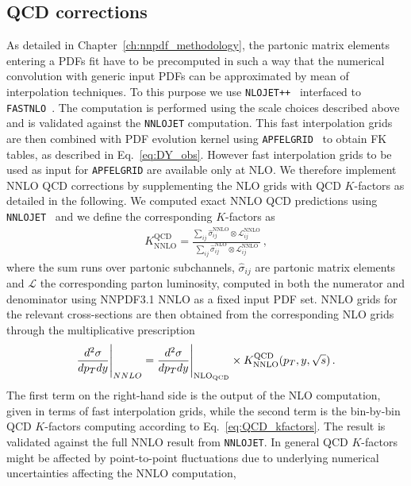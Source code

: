 \subsection{QCD corrections}
As detailed in Chapter~\ref{ch:nnpdf_methodology}, the partonic matrix elements entering a PDFs fit
have to be precomputed in such a way that the numerical convolution with generic input PDFs can be approximated by mean
of interpolation techniques. 
To this purpose we use {\tt NLOJET++}~\cite{Nagy:2001fj} interfaced to {\tt F{\small AST}NLO}~\cite{Wobisch:2011ij}.
The computation is performed using the scale choices described above and is validated against the {\tt NNLOJET} computation.
This fast interpolation grids are then combined with PDF evolution kernel using {\tt APFEL{\small GRID}}~\cite{Bertone:2016lga}
to obtain FK tables, as described in Eq.~\ref{eq:DY_obs}.
However fast interpolation grids to be used as input for {\tt APFEL{\small GRID}} are available only at NLO.
We therefore implement NNLO QCD corrections by supplementing the NLO grids with QCD $K$-factors as detailed in the following.
We computed exact NNLO QCD predictions using {\tt NNLOJET}~\cite{Gehrmann-DeRidder:2019ibf} and we define the 
corresponding $K$-factors as
\begin{align}
    \label{eq:QCD_kfactors}
    K^{\text{QCD}}_{\text{NNLO}} = \frac{\sum_{ij}\hat{\sigma}_{ij}^{\text{NNLO}}\otimes \mathcal{L}_{ij}^{\text{NNLO}}}
    {\sum_{ij}\hat{\sigma}_{ij}^{\text{NLO}}\otimes \mathcal{L}_{ij}^{\text{NNLO}}}\,,
\end{align}
where the sum runs over partonic subchannels, $\hat{\sigma}_{ij}$ are partonic matrix elements and $\mathcal{L}$
the corresponding parton luminosity, computed in both the numerator and denominator using NNPDF3.1 NNLO as a fixed input 
PDF set.
NNLO grids for the relevant cross-sections are then obtained from the corresponding NLO grids through the multiplicative
prescription
\begin{align}
    \label{eq:NNLO_kfactors}
    \frac{d^2\sigma}{dp_T dy}\Bigg|_{NNLO} = \frac{d^2\sigma}{dp_T dy}
    \Bigg|_{\rm NLO_{QCD}} \times K_{\rm NNLO}^{\rm QCD}(p_T,y,\sqrt{s})\, .
\end{align}
The first term on the right-hand side is the output of the NLO computation, given in terms of fast interpolation grids,
while the second term is the bin-by-bin QCD $K$-factors computing according to Eq.~\ref{eq:QCD_kfactors}. 
The result is validated against the full NNLO result from {\tt NNLOJET}. In general QCD $K$-factors might be affected by 
point-to-point fluctuations due to underlying numerical uncertainties affecting the NNLO computation,
